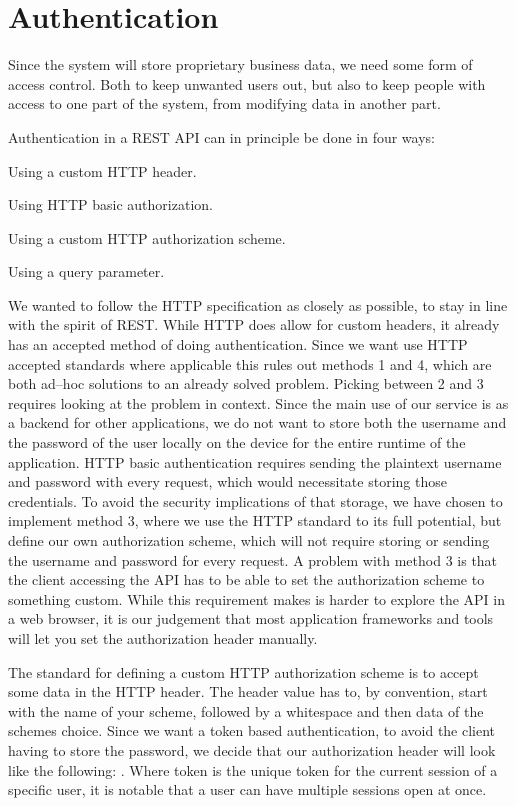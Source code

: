 \section{Authentication}\label{sec:authentication}

Since the system will store proprietary business data, we need some form of
access control. Both to keep unwanted users out, but also to keep people with
access to one part of the system, from modifying data in another part.

Authentication in a REST API can in principle be done in four ways:

\begin{enumberate}
    \item Using a custom HTTP header.
    \item Using HTTP basic authorization.
    \item Using a custom HTTP authorization scheme.
    \item Using a query parameter.
\end{enumberate}

We wanted to follow the HTTP specification as closely as possible, to stay in
line with the spirit of REST\@. While HTTP does allow for custom headers, it
already has an accepted method of doing authentication. Since we want use HTTP
accepted standards where applicable this rules out methods 1 and 4, which are
both ad--hoc solutions to an already solved problem. Picking between 2 and
3 requires looking at the problem in context. Since the main use of our service
is as a backend for other applications, we do not want to store both the
username and the password of the user locally on the device for the entire
runtime of the application. HTTP basic authentication requires sending the
plaintext username and password with every request, which would necessitate
storing those credentials. To avoid the security implications of that storage,
we have chosen to implement method 3, where we use the HTTP standard to its full
potential, but define our own authorization scheme, which will not require
storing or sending the username and password for every request.\cite{http_basic}
A problem with method 3 is that the client accessing the API has to be able to
set the authorization scheme to something custom. While this requirement makes
is harder to explore the API in a web browser, it is our judgement that most
application frameworks and tools will let you set the authorization header
manually.

The standard for defining a custom HTTP authorization scheme is to accept some
data in the HTTP  header. The header value has to, by
convention, start with the name of your scheme, followed by a whitespace and
then data of the schemes choice\cite{http_basic}. Since we want a token based
authentication, to avoid the client having to store the password, we decide that
our authorization header will look like the following: . Where token is the unique token for the current session of
a specific user, it is notable that a user can have multiple sessions open at
once.

